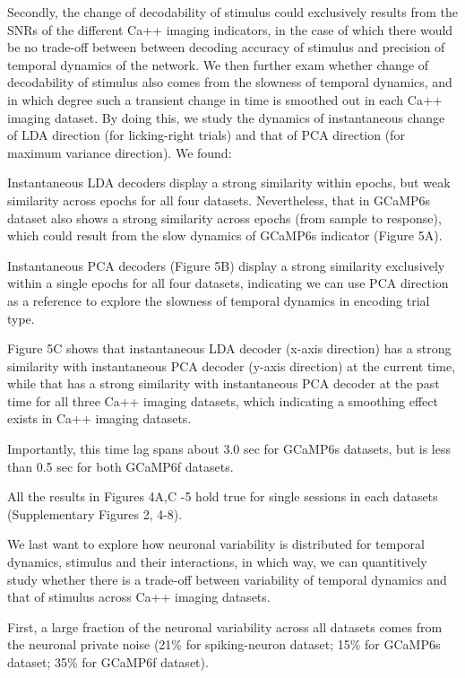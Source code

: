 \documentclass[12pt, oneside]{nature}
\begin{document}
\noindent Secondly, the change of decodability of stimulus could exclusively results from the
SNRs of the different Ca++ imaging indicators, in the case of which there would
be no trade-off between between decoding accuracy of stimulus
and precision of temporal dynamics of the network. We then further exam whether
change of decodability of stimulus also comes from the slowness of temporal dynamics,
and in which degree such a transient change in time is smoothed out in each Ca++ imaging dataset.
By doing this, we study the dynamics of instantaneous change of LDA direction 
(for licking-right trials) and that of PCA direction (for maximum variance direction). 
We found:

\noindent Instantaneous LDA decoders display a strong similarity within 
epochs, but weak similarity across epochs for all four datasets. Nevertheless,
that in GCaMP6s dataset also shows a strong similarity across epochs (from sample to response),
which could result from the slow dynamics of GCaMP6s indicator (Figure 5A).

\noindent Instantaneous PCA decoders (Figure 5B) display a strong similarity 
exclusively within a single epochs for all four datasets, indicating
we can use PCA direction as a reference to explore the slowness
of temporal dynamics in encoding trial type.

\noindent Figure 5C shows that instantaneous LDA decoder (x-axis direction) 
has a strong similarity with instantaneous PCA decoder (y-axis direction) at 
the current time, while that has a strong similarity with instantaneous PCA 
decoder at the past time for all three Ca++ imaging datasets, which indicating 
a smoothing effect exists in Ca++ imaging datasets.  

\noindent Importantly, this time lag spans about 3.0 sec for GCaMP6s datasets, 
but is less than 0.5 sec for both GCaMP6f datasets.

\noindent All the results in Figures 4A,C -5 hold true for single sessions
in each datasets (Supplementary Figures 2, 4-8).

\noindent We last want to explore how neuronal variability is distributed for
temporal dynamics, stimulus and their interactions, in which way,
we can quantitively study whether there is a trade-off between 
variability of temporal dynamics and that of stimulus across Ca++ imaging
datasets.

\noindent First, a large fraction of the neuronal variability across all datasets
comes from the neuronal private noise (21\% for spiking-neuron dataset; 
15\% for GCaMP6s dataset; 35\% for GCaMP6f dataset).
\end{document}
